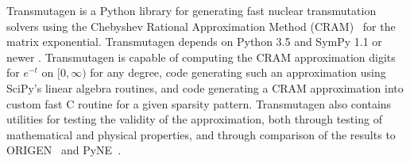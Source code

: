 Transmutagen is a Python library for generating fast nuclear transmutation
solvers using the Chebyshev Rational Approximation Method
(CRAM)~\cite{ationneeded} for the matrix exponential. Transmutagen depends on
Python 3.5 and SymPy 1.1 or newer . Transmutagen is
capable of computing the CRAM approximation digits for $e^{-t}$ on
$[0, \infty)$ for any degree, code generating such an approximation using
SciPy's linear algebra routines, and code generating a CRAM approximation into
custom fast C routine for a given sparsity pattern. Transmutagen also contains
utilities for testing the validity of the approximation, both through testing
of mathematical and physical properties, and through comparison of the results
to ORIGEN~\cite{ationneeded} and PyNE~\cite{ationneeded}.
